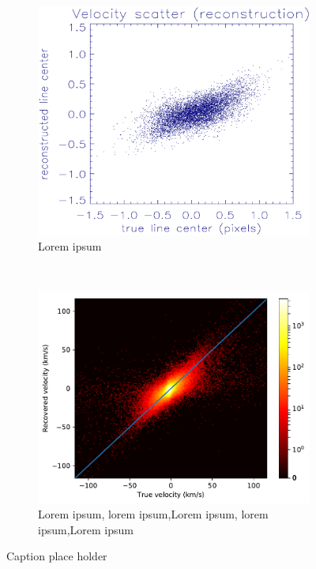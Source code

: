 \documentclass[10pt,letterpaper]{article}
\begin{document}
				\begin{figure}[t!]
					\centering
					\begin{subfigure}[t]{0.5\textwidth}
						\centering
						\includegraphics[width=\textwidth]{fig/smart_hist}
						\caption{Lorem ipsum}
					\end{subfigure}%
					~ 
					\begin{subfigure}[t]{0.5\textwidth}
						\centering
						\includegraphics[width=\textwidth]{fig/minnd_hist}
						\caption{Lorem ipsum, lorem ipsum,Lorem ipsum, lorem ipsum,Lorem ipsum}
					\end{subfigure}
					\caption{Caption place holder}
				\end{figure}
				
\end{document}
